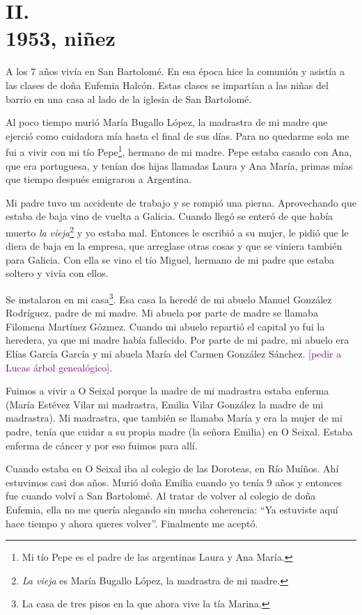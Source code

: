 \documentclass[12pt,a5paper]{book}
\begin{document}
\section*{II.\\1953, niñez}

A los 7 años vivía en San Bartolomé. En esa época hice la comunión y asistía a las clases de doña Eufemia Halcón. Estas clases se impartían a las niñas del barrio en una casa al lado de la iglesia de San Bartolomé.

Al poco tiempo murió María Bugallo López, la madrastra de mi madre que ejerció como cuidadora mía hasta el final de sus días. Para no quedarme sola me fui a vivir con mi tío Pepe\footnote{Mi tío Pepe es el padre de las argentinas Laura y Ana María.}, hermano de mi madre. Pepe estaba casado con Ana, que era portuguesa, y tenían dos hijas llamadas Laura y Ana María, primas mías que tiempo después emigraron a Argentina. 

Mi padre tuvo un accidente de trabajo y se rompió una pierna. Aprovechando que estaba de baja vino de vuelta a Galicia. Cuando llegó se enteró de que había muerto \textit{la vieja}\footnote{\textit{La vieja} es María Bugallo López, la madrastra de mi madre.} y yo estaba mal. Entonces le escribió a su mujer, le pidió que le diera de baja en la empresa, que arreglase otras cosas y que se viniera también para Galicia. Con ella se vino el tío Miguel, hermano de mi padre que estaba soltero y vivía con ellos.

Se instalaron en mi casa\footnote{La casa de tres pisos en la que ahora vive la tía Marina.}. Esa casa la heredé de mi abuelo Manuel González Rodríguez, padre de mi madre. Mi abuela por parte de madre se llamaba Filomena Martínez Gózmez. Cuando mi abuelo repartió el capital yo fui la heredera, ya que mi madre había fallecido. Por parte de mi padre, mi abuelo era Elías García García y mi abuela María del Carmen González Sánchez. \textcolor{purple}{[pedir a Lucas árbol genealógico]}.

Fuimos a vivir a O Seixal porque la madre de mi madrastra estaba enferma (María Estévez Vilar mi madrastra, Emilia Vilar González la madre de mi madrastra). Mi madrastra, que también se llamaba María y era la mujer de mi padre, tenía que cuidar a su propia madre (la señora Emilia) en O Seixal. Estaba enferma de cáncer y por eso fuimos para allí.

Cuando estaba en O Seixal iba al colegio de las Doroteas, en Río Muíños. Ahí estuvimos casi dos años. Murió doña Emilia cuando yo tenía 9 años y entonces fue cuando volví a San Bartolomé. Al tratar de volver al colegio de doña Eufemia, ella no me quería alegando sin mucha coherencia: ``Ya estuviste aquí hace tiempo y ahora queres volver''. Finalmente me aceptó.
\end{document}
